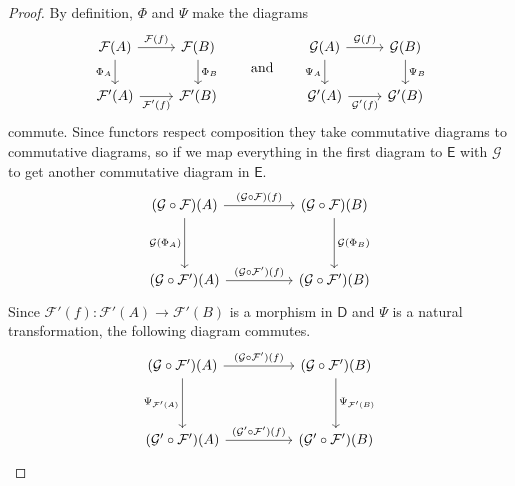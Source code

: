 \documentclass[notes.tex]{subfiles}
\begin{document}
\begin{proof}
  By definition, $\Phi$ and $\Psi$ make the diagrams
  \begin{equation*}
    \begin{tikzcd}
      \mathcal{F}(A)
      \arrow[d, swap, "\Phi_{A}"]
      \arrow[r, "\mathcal{F}(f)"]
      & \mathcal{F}(B)
      \arrow[d, "\Phi_{B}"]
      \\
      \mathcal{F}'(A)
      \arrow[r, swap, "\mathcal{F}'(f)"]
      & \mathcal{F}'(B)
    \end{tikzcd}
    \qquad\text{and}\qquad
    \begin{tikzcd}
      \mathcal{G}(A)
      \arrow[d, swap, "\Psi_{A}"]
      \arrow[r, "\mathcal{G}(f)"]
      & \mathcal{G}(B)
      \arrow[d, "\Psi_{B}"]
      \\
      \mathcal{G}'(A)
      \arrow[r, swap, "\mathcal{G}'(f)"]
      & \mathcal{G}'(B)
    \end{tikzcd}
  \end{equation*}
  commute. Since functors respect composition they take commutative diagrams to commutative diagrams, so if we map everything in the first diagram to $\mathsf{E}$ with $\mathcal{G}$ to get another commutative diagram in $\mathsf{E}$.
  \begin{equation*}
    \begin{tikzcd}[row sep=huge, column sep=huge]
      (\mathcal{G} \circ \mathcal{F})(A)
      \arrow[d, swap, "\mathcal{G}(\Phi_{A})"]
      \arrow[r, "(\mathcal{G} \circ \mathcal{F})(f)"]
      & (\mathcal{G} \circ \mathcal{F})(B)
      \arrow[d, "\mathcal{G}(\Phi_{B})"]
      \\
      (\mathcal{G} \circ \mathcal{F}')(A)
      \arrow[r, "(\mathcal{G} \circ \mathcal{F}')(f)"]
      & (\mathcal{G} \circ \mathcal{F}')(B)
    \end{tikzcd}
  \end{equation*}
  Since $\mathcal{F}'(f)\colon \mathcal{F}'(A) \to \mathcal{F}'(B)$ is a morphism in $\mathsf{D}$ and $\Psi$ is a natural transformation, the following diagram commutes.
  \begin{equation*}
    \begin{tikzcd}[row sep=huge, column sep=huge]
      (\mathcal{G} \circ \mathcal{F}')(A)
      \arrow[r, "(\mathcal{G} \circ \mathcal{F}')(f)"]
      \arrow[d, swap, "\Psi_{\mathcal{F}'(A)}"]
      & (\mathcal{G} \circ \mathcal{F}')(B)
      \arrow[d, "\Psi_{\mathcal{F}'(B)}"]
      \\
      (\mathcal{G}' \circ \mathcal{F}')(A)
      \arrow[r, "(\mathcal{G}' \circ \mathcal{F}')(f)"]
      & (\mathcal{G}' \circ \mathcal{F}')(B)
    \end{tikzcd}
  \end{equation*}


\end{proof}
\end{document}
